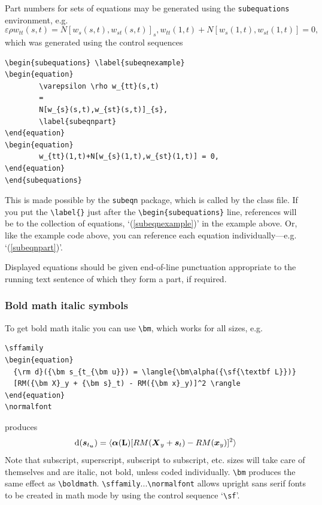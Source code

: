 \documentclass{rQUF2e}
\theoremstyle{plain}
\theoremstyle{definition}
\theoremstyle{remark}
\begin{document}
Part numbers for sets of equations may be generated using the \texttt{subequations} environment, e.g.
\begin{subequations} \label{subeqnexample}
\begin{equation}
        \varepsilon \rho w_{tt}(s,t)
        =
        N[w_{s}(s,t),w_{st}(s,t)]_{s},
        \label{subeqnpart}
\end{equation}
\begin{equation}
        w_{tt}(1,t)+N[w_{s}(1,t),w_{st}(1,t)] = 0,
\end{equation}
\end{subequations}
which was generated using the control sequences
\begin{verbatim}
\begin{subequations} \label{subeqnexample}
\begin{equation}
        \varepsilon \rho w_{tt}(s,t)
        =
        N[w_{s}(s,t),w_{st}(s,t)]_{s},
        \label{subeqnpart}
\end{equation}
\begin{equation}
        w_{tt}(1,t)+N[w_{s}(1,t),w_{st}(1,t)] = 0,
\end{equation}
\end{subequations}
\end{verbatim}
This is made possible by the \texttt{subeqn} package, which is called by the class file. If you put the
\verb"\label{}" just after the \verb"\begin{subequations}" line, references will be to the collection of
equations, `(\ref{subeqnexample})' in the example above. Or, like the example code above, you can reference each
equation individually---e.g. `(\ref{subeqnpart})'.

Displayed equations should be given end-of-line punctuation appropriate to the running text sentence of which they form a part, if required.

\subsubsection{Bold math italic symbols}

To get bold math italic you can use \verb"\bm", which works for all sizes, e.g.
\begin{verbatim}
\sffamily
\begin{equation}
  {\rm d}({\bm s_{t_{\bm u}}) = \langle{\bm\alpha({\sf{\textbf L}})}
  [RM({\bm X}_y + {\bm s}_t) - RM({\bm x}_y)]^2 \rangle
\end{equation}
\normalfont
\end{verbatim}
produces\sffamily
\begin{equation}
{\rm d}({\bm s_{t_{\bm u}}}) = \langle {\bm\alpha({\sf{\textbf
L}})}[RM({\bm X}_y + {\bm s}_t) - RM({\bm x}_y)]^2 \rangle
\end{equation}\normalfont
Note that subscript, superscript, subscript to subscript, etc.
sizes will take care of themselves and are italic, not bold,
unless coded individually. \verb"\bm" produces the same effect as
\verb"\boldmath". \verb"\sffamily"...\verb"\normalfont" allows
upright sans serif fonts to be created in math mode by using the
control sequence `\verb"\sf"'.
\end{document}
